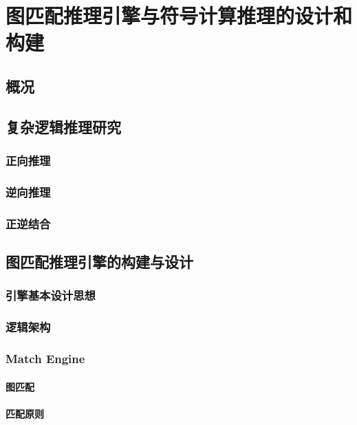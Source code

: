 \documentclass{standalone}
\begin{document}
\chapter{图匹配推理引擎与符号计算推理的设计和构建}
\section{概况}

\section{复杂逻辑推理研究}

\subsection{正向推理}

\subsection{逆向推理}

\subsection{正逆结合}

\section{图匹配推理引擎的构建与设计}

\subsection{引擎基本设计思想}

\subsection{逻辑架构}

\subsection{Match Engine}

\subsubsection{图匹配}

\subsubsection{匹配原则}
\end{document}
